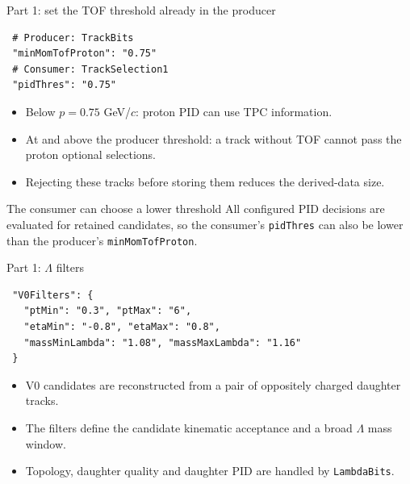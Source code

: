 \begin{frame}[fragile]{Part 1: set the TOF threshold already in the producer}
 \begin{lstlisting}
 # Producer: TrackBits
 "minMomTofProton": "0.75"
 # Consumer: TrackSelection1
 "pidThres": "0.75"
 \end{lstlisting}
 \begin{itemize}
 \item Below $p=0.75$ GeV/$c$: proton PID can use TPC information.
 \item At and above the producer threshold: a track without TOF cannot pass the proton optional selections.
 \item Rejecting these tracks before storing them reduces the derived-data size.
 \end{itemize}
 \begin{block}{The consumer can choose a lower threshold}
 All configured PID decisions are evaluated for retained candidates, so the consumer's \texttt{pidThres} can also be lower than the producer's \texttt{minMomTofProton}.
 \end{block}
\end{frame}

\begin{frame}[fragile]{Part 1: $\Lambda$ filters}
 \begin{lstlisting}
 "V0Filters": {
   "ptMin": "0.3", "ptMax": "6",
   "etaMin": "-0.8", "etaMax": "0.8",
   "massMinLambda": "1.08", "massMaxLambda": "1.16"
 }
 \end{lstlisting}
 \begin{itemize}
 \item V0 candidates are reconstructed from a pair of oppositely charged daughter tracks.
 \item The filters define the candidate kinematic acceptance and a broad $\Lambda$ mass window.
 \item Topology, daughter quality and daughter PID are handled by \texttt{LambdaBits}.
 \end{itemize}
\end{frame}

